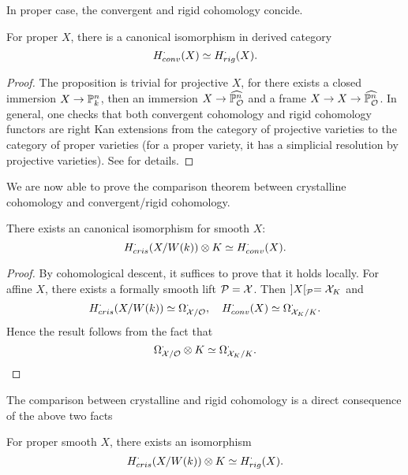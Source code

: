 In proper case, the convergent and rigid cohomology concide.
\begin{proposition}
    For proper $X$, there is a canonical isomorphism in derived category
    \[
        H^\cdot_{conv}(X) \simeq H^\cdot_{rig}(X).
    \]
\end{proposition}

\begin{proof}
    The proposition is trivial for projective $X$, 
    for there exists a closed immersion $X \to {\mathbb {P}}_k^n$, 
    then an immersion $X \to \widehat{{\mathbb {P}}_{\mathcal {O}}^n}$ and a frame $X \to X \to \widehat{{\mathbb {P}}_{\mathcal {O}}^n}$. 
    In general, one checks that both convergent cohomology and rigid cohomology functors 
    are right Kan extensions from the category of projective varieties 
    to the category of proper varieties 
    (for a proper variety, it has a simplicial resolution by projective varieties). 
    See \cite{Tsu} for details. 
\end{proof}

We are now able to prove the comparison theorem 
between crystalline cohomology and convergent/rigid cohomology.
\begin{theorem}
    There exists an canonical isomorphism for smooth $X$:
    \[
        H^\cdot_{cris}(X/W(k)) \otimes K \simeq H^\cdot_{conv}(X).
    \]
\end{theorem}

\begin{proof}
    By cohomological descent, it suffices to prove that it holds locally. 
    For affine $X$, there exists a formally smooth lift ${\mathcal {P}}={\mathcal {X}}$. Then $]X[_{\mathcal {P}}={\mathcal {X}}_K$ and 
    \[
        H^\cdot_{cris}(X/W(k)) \simeq \Omega_{{\mathcal {X}}/{\mathcal {O}}}^\cdot, \quad H^\cdot_{conv}(X) \simeq \Omega_{{\mathcal {X}}_K/K}^\cdot.
    \]
    Hence the result follows from the fact that 
    \[
        \Omega_{{\mathcal {X}}/{\mathcal {O}}}^\cdot \otimes K \simeq \Omega_{{\mathcal {X}}_K/K}^\cdot.
    \]
\end{proof}

The comparison between crystalline and rigid cohomology 
is a direct consequence of the above two facts
\begin{corollary}[\cite{Be1}]
    For proper smooth $X$, there exists an isomorphism 
    \[
        H^\cdot_{cris}(X/W(k)) \otimes K \simeq H^\cdot_{rig}(X).
    \]
\end{corollary}

